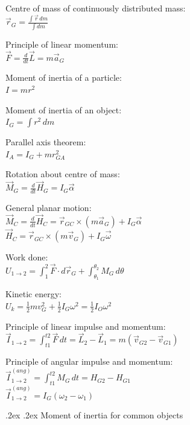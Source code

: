 \documentclass[10pt,landscape,a4paper]{article}
\makeatletter
\renewcommand{\section}{\@startsection{section}{1}{0mm}%
  {.2ex}%
  {.2ex}%
  {\color{myblue}\sffamily\small\bfseries}}
\makeatother
\begin{document}
\begin{multicols*}{5}
  Centre of mass of continuously distributed mass: \\
  \(\vec{r}_G = \frac{\int \vec{r} \, dm}{\int dm}\)

  Principle of linear momentum: \\
  \(\vec{F} = \frac{d}{dt} \vec{L} = m \vec{a}_G\)

  Moment of inertia of a particle: \\
  \(I = mr^2\)

  Moment of inertia of an object: \\
  \(I_G = \int r^2 \, dm\)

  Parallel axis theorem: \\
  \(I_A = I_G + mr_{GA}^2\)

  Rotation about centre of mass: \\
  \(\vec{M}_G = \frac{d}{dt} \vec{H}_G = I_G \vec{\alpha}\)

  General planar motion: \\
  \(\vec{M}_C = \frac{d}{dt} \vec{H}_C = \vec{r}_{GC} \times (m \vec{a}_G) + I_{G} \vec{\alpha}\) \\
  \(\vec{H}_C = \vec{r}_{GC} \times (m \vec{v}_G) + I_{G} \vec{\omega}\)

  Work done: \\
  \(U_{1 \rightarrow 2} = \int_1^2 \vec{F} \cdot d \vec{r}_G + \int_{\theta_1}^{\theta_2} M_G \, d \theta\)

  Kinetic energy: \\
  \(U_k = \frac{1}{2} mv_{G}^2 + \frac{1}{2} I_G \omega^2 = \frac{1}{2} I_O \omega^2\)

  Principle of linear impulse and momentum: \\
  \(\vec{I}_{1 \rightarrow 2} = \int_{t1}^{t2} \vec{F} \, dt = \vec{L}_2 - \vec{L}_1 = m (\vec{v}_{G2} - \vec{v}_{G1})\)

  Principle of angular impulse and momentum: \\
  \(\vec{I}_{1 \rightarrow 2}^{(ang)} = \int_{t1}^{t2} M_G \, dt = H_{G2} - H_{G1}\) \\
  \(\vec{I}_{1 \rightarrow 2}^{(ang)} = I_G (\omega_2 - \omega_1)\)


  \section{Moment of inertia for common objects}


\end{multicols*}
\end{document}
